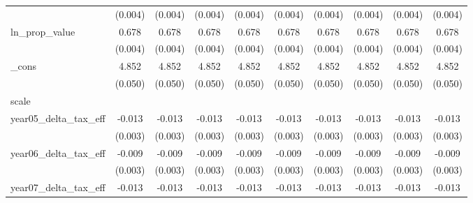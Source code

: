 {\begin{tabular}{l*{9}{c}}
            &     (0.004)         &     (0.004)         &     (0.004)         &     (0.004)         &     (0.004)         &     (0.004)         &     (0.004)         &     (0.004)         &     (0.004)         \\
[1em]
ln_prop_value&       0.678\sym{***}&       0.678\sym{***}&       0.678\sym{***}&       0.678\sym{***}&       0.678\sym{***}&       0.678\sym{***}&       0.678\sym{***}&       0.678\sym{***}&       0.678\sym{***}\\
            &     (0.004)         &     (0.004)         &     (0.004)         &     (0.004)         &     (0.004)         &     (0.004)         &     (0.004)         &     (0.004)         &     (0.004)         \\
[1em]
_cons       &       4.852\sym{***}&       4.852\sym{***}&       4.852\sym{***}&       4.852\sym{***}&       4.852\sym{***}&       4.852\sym{***}&       4.852\sym{***}&       4.852\sym{***}&       4.852\sym{***}\\
            &     (0.050)         &     (0.050)         &     (0.050)         &     (0.050)         &     (0.050)         &     (0.050)         &     (0.050)         &     (0.050)         &     (0.050)         \\
\hline
scale       &                     &                     &                     &                     &                     &                     &                     &                     &                     \\
year05_delta_tax_eff&      -0.013\sym{***}&      -0.013\sym{***}&      -0.013\sym{***}&      -0.013\sym{***}&      -0.013\sym{***}&      -0.013\sym{***}&      -0.013\sym{***}&      -0.013\sym{***}&      -0.013\sym{***}\\
            &     (0.003)         &     (0.003)         &     (0.003)         &     (0.003)         &     (0.003)         &     (0.003)         &     (0.003)         &     (0.003)         &     (0.003)         \\
[1em]
year06_delta_tax_eff&      -0.009\sym{***}&      -0.009\sym{***}&      -0.009\sym{***}&      -0.009\sym{***}&      -0.009\sym{***}&      -0.009\sym{***}&      -0.009\sym{***}&      -0.009\sym{***}&      -0.009\sym{***}\\
            &     (0.003)         &     (0.003)         &     (0.003)         &     (0.003)         &     (0.003)         &     (0.003)         &     (0.003)         &     (0.003)         &     (0.003)         \\
[1em]
year07_delta_tax_eff&      -0.013\sym{***}&      -0.013\sym{***}&      -0.013\sym{***}&      -0.013\sym{***}&      -0.013\sym{***}&      -0.013\sym{***}&      -0.013\sym{***}&      -0.013\sym{***}&      -0.013\sym{***}\\

\end{tabular}}
